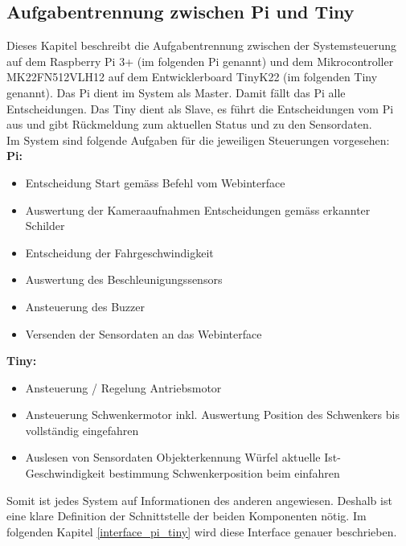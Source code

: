 \documentclass[../../main.tex]{subfiles}
\begin{document}
    \subsection{Aufgabentrennung zwischen Pi und Tiny} \label{aufgabentrennung_pi_tiny}
    Dieses Kapitel beschreibt die Aufgabentrennung zwischen der Systemsteuerung auf dem Raspberry Pi 3+ (im folgenden Pi genannt) und dem Mikrocontroller MK22FN512VLH12 auf dem Entwicklerboard TinyK22 (im folgenden Tiny genannt). Das Pi dient im System als Master. Damit fällt das Pi alle Entscheidungen. Das Tiny dient als Slave, es führt die Entscheidungen vom Pi aus und gibt Rückmeldung zum aktuellen Status und zu den Sensordaten.\\
    Im System sind folgende Aufgaben für die jeweiligen Steuerungen vorgesehen:\\
    \textbf{Pi:}
    \begin{itemize}
        \item Entscheidung Start gemäss Befehl vom Webinterface
        \item Auswertung der Kameraaufnahmen
            \subitem Entscheidungen gemäss erkannter Schilder
        \item Entscheidung der Fahrgeschwindigkeit
        \item Auswertung des Beschleunigungssensors
        \item Ansteuerung des Buzzer
        \item Versenden der Sensordaten an das Webinterface
    \end{itemize}

    \textbf{Tiny:}
    \begin{itemize}
        \item Ansteuerung / Regelung Antriebsmotor
        \item Ansteuerung Schwenkermotor
            \subitem inkl. Auswertung Position des Schwenkers bis vollständig eingefahren
        \item Auslesen von Sensordaten
            \subitem Objekterkennung Würfel
            \subitem aktuelle Ist-Geschwindigkeit
            \subitem bestimmung Schwenkerposition beim einfahren
    \end{itemize}

    Somit ist jedes System auf Informationen des anderen angewiesen. Deshalb ist eine klare Definition der Schnittstelle der beiden Komponenten nötig. Im folgenden Kapitel \ref{interface_pi_tiny} wird diese Interface genauer beschrieben.

    \pagebreak
\end{document}
